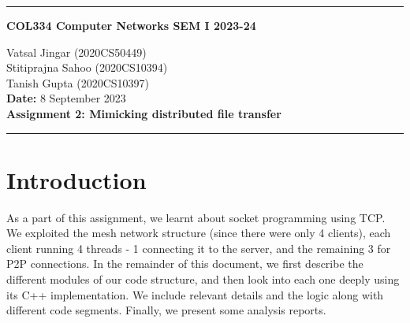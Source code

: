 \documentclass[12pt]{scrartcl}
\begin{document}
\onehalfspacing
\newcommand{\current}{September 2023}
\begin{center}
\hrule
\vspace{.4cm}
{\textbf { \large COL334 Computer Networks SEM I 2023-24}}
\end{center}
{
    \begin{center}
        Vatsal Jingar (2020CS50449)\\ Stitiprajna Sahoo (2020CS10394)\\ Tanish Gupta (2020CS10397)\\
        \textbf{Date:} 8 September 2023 \\
        \textbf{Assignment 2: Mimicking distributed file transfer}
    
    \end{center}
{ 
    \hrule
}
}

\section{Introduction}

As a part of this assignment, we learnt about socket programming using TCP. We exploited the mesh network structure (since there were only 4 clients), each client running 4 threads - 1 connecting it to the server, and the remaining 3 for P2P connections. In the remainder of this document, we first describe the different modules of our code structure, and then look into each one deeply using its C++ implementation. We include relevant details and the logic along with different code segments. Finally, we present some analysis reports.
\end{document}
